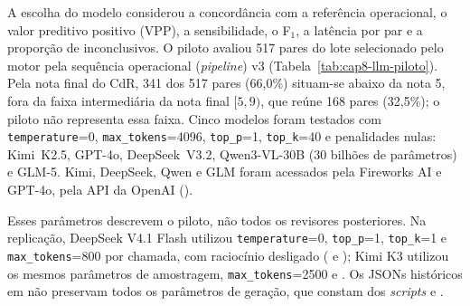 A escolha do modelo considerou a concordância com a referência operacional, o valor preditivo positivo (VPP), a sensibilidade, o F$_1$, a latência por par e a proporção de inconclusivos. O piloto avaliou 517 pares do lote selecionado pelo motor pela sequência operacional (\textit{pipeline}) v3 (Tabela~\ref{tab:cap8-llm-piloto}). Pela nota final do CdR, 341 dos 517 pares (66,0\%) situam-se abaixo da nota 5, fora da faixa intermediária da nota final $[5,9)$, que reúne 168 pares (32,5\%); o piloto não representa essa faixa. Cinco modelos foram testados com \texttt{temperature}=0, \texttt{max\_tokens}=4096, \texttt{top\_p}=1, \texttt{top\_k}=40 e penalidades nulas: Kimi~K2.5, GPT-4o, DeepSeek~V3.2, Qwen3-VL-30B (30 bilhões de parâmetros) e GLM-5. Kimi, DeepSeek, Qwen e GLM foram acessados pela Fireworks AI e GPT-4o, pela API da OpenAI ().

Esses parâmetros descrevem o piloto, não todos os revisores posteriores. Na replicação, DeepSeek V4.1 Flash utilizou \texttt{temperature}=0, \texttt{top\_p}=1, \texttt{top\_k}=1 e \texttt{max\_tokens}=800 por chamada, com raciocínio desligado ( e ); Kimi K3 utilizou os mesmos parâmetros de amostragem, \texttt{max\_\allowbreak tokens}=2500 e . Os JSONs históricos em  não preservam todos os parâmetros de geração, que constam dos \textit{scripts}  e  \cite{Jardim2026phdrepo}.

\begin{table}[!ht]
\centering
\caption{Avaliação comparativa de modelos para revisão assistida ($n=517$ pares do lote selecionado pelo motor; intervalos de Wilson, 95\%).}
\label{tab:cap8-llm-piloto}
\end{table}

